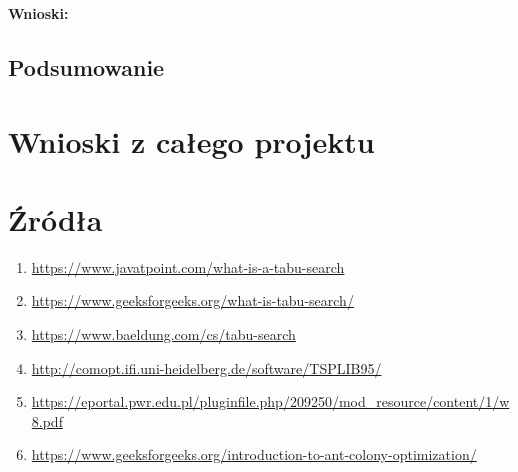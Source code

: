 \documentclass{article}
\begin{document}
        \textbf{Wnioski: } 
      \subsection{Podsumowanie}

    \section{Wnioski z całego projektu}


    \section{Źródła}
      \begin{enumerate}[label=\arabic*.]
        \item \url{https://www.javatpoint.com/what-is-a-tabu-search}
        \item \url{https://www.geeksforgeeks.org/what-is-tabu-search/}
        \item \url{https://www.baeldung.com/cs/tabu-search}
        \item \url{http://comopt.ifi.uni-heidelberg.de/software/TSPLIB95/} \label{src:TspLib}
        \item \url{https://eportal.pwr.edu.pl/pluginfile.php/209250/mod_resource/content/1/w8.pdf}
        \item \url{https://www.geeksforgeeks.org/introduction-to-ant-colony-optimization/}
      \end{enumerate}
\end{document}
